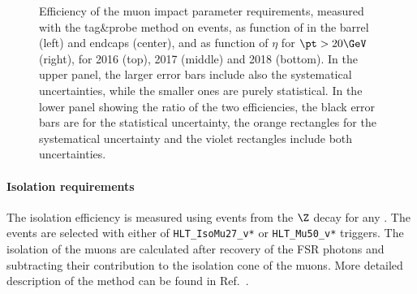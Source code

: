 \begin{figure}[htbp]
\begin{center}
    \caption{Efficiency of the muon impact parameter requirements, measured with the tag\&probe method on \Z events, as function of \pt in the barrel (left) and endcaps (center), and as function of $\eta$ for $\pt > 20\GeV$ (right), for 2016 (top), 2017 (middle) and 2018 (bottom). In the upper panel, the larger error bars include also the systematical uncertainties, while the smaller ones are purely statistical. In the lower panel showing the ratio of the two efficiencies, the black error bars are for the statistical uncertainty, the orange rectangles for the systematical uncertainty and the violet rectangles include both uncertainties.}
    \label{fig:MuonIDEff_2}
\end{center}
\end{figure}

\paragraph*{Isolation requirements}
The isolation efficiency is measured using events from the $\Z$ decay for any \pt. The events are selected with either of \verb=HLT_IsoMu27_v*= or \verb=HLT_Mu50_v*= triggers. The isolation of the muons are calculated after recovery of the FSR photons and subtracting their contribution to the isolation cone of the muons. More detailed description of the method can be found in Ref.~\cite{AN-16-217}.

